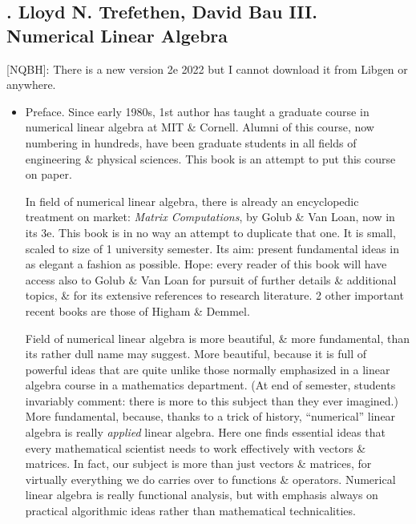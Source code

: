 \documentclass{article}
\begin{document}

\subsection{\cite{Trefethen_Bau1997,Trefethen_Bau2022}. {\sc Lloyd N. Trefethen, David Bau III}. Numerical Linear Algebra}
[NQBH]: There is a new version 2e 2022 but I cannot download it from Libgen or anywhere.
\begin{itemize}
	\item {\sf Preface.} Since early 1980s, 1st author has taught a graduate course in numerical linear algebra at MIT \& Cornell. Alumni of this course, now numbering in hundreds, have been graduate students in all fields of engineering \& physical sciences. This book is an attempt to put this course on paper.
	
	In field of numerical linear algebra, there is already an encyclopedic treatment on market: {\it Matrix Computations}, by {\sc Golub \& Van Loan}, now in its 3e. This book is in no way an attempt to duplicate that one. It is small, scaled to size of 1 university semester. Its aim: present fundamental ideas in as elegant a fashion as possible. Hope: every reader of this book will have access also to {\sc Golub \& Van Loan} for pursuit of further details \& additional topics, \& for its extensive references to research literature. 2 other important recent books are those of {\sc Higham \& Demmel}.
		
	Field of numerical linear algebra is more beautiful, \& more fundamental, than its rather dull name may suggest. More beautiful, because it is full of powerful ideas that are quite unlike those normally emphasized in a linear algebra course in a mathematics department. (At end of semester, students invariably comment: there is more to this subject than they ever imagined.) More fundamental, because, thanks to a trick of history, ``numerical'' linear algebra is really {\it applied} linear algebra. Here one finds essential ideas that every mathematical scientist needs to work effectively with vectors \& matrices. In fact, our subject is more than just vectors \& matrices, for virtually everything we do carries over to functions \& operators. Numerical linear algebra is really functional analysis, but with emphasis always on practical algorithmic ideas rather than mathematical technicalities.
	

\end{itemize}
\end{document}
